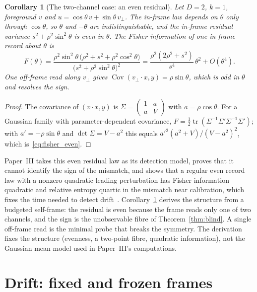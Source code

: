 \documentclass[12pt]{article}
\newtheorem{corollary}[theorem]{Corollary}
\theoremstyle{definition}
\newcommand{\tr}{\operatorname{tr}}
\begin{document}
\begin{corollary}[The two-channel case: an even residual]
\label{cor:even}
Let $D=2$, $k=1$, foreground $v$ and $u=\cos\theta\,v+\sin\theta\,v_\perp$. The in-frame law depends on $\theta$ only through $\cos\theta$, so $\theta$ and $-\theta$ are indistinguishable, and the in-frame residual variance $s^2+\rho^2\sin^2\theta$ is even in $\theta$. The Fisher information of one in-frame record about $\theta$ is
\begin{equation}
\label{eq:fisher_even}
F(\theta)=\frac{\rho^2\sin^2\theta\,\bigl(\rho^2+s^2+\rho^2\cos^2\theta\bigr)}{\bigl(s^2+\rho^2\sin^2\theta\bigr)^2}
=\frac{\rho^2(2\rho^2+s^2)}{s^4}\,\theta^2+O(\theta^4).
\end{equation}
One off-frame read along $v_\perp$ gives $\operatorname{Cov}(v_\perp\cdot x,y)=\rho\sin\theta$, which is odd in $\theta$ and resolves the sign.
\end{corollary}

\begin{proof}
The covariance of $(v\cdot x,y)$ is $\Sigma=\begin{pmatrix}1&a\\a&V\end{pmatrix}$ with $a=\rho\cos\theta$. For a Gaussian family with parameter-dependent covariance, $F=\tfrac12\tr(\Sigma^{-1}\Sigma'\Sigma^{-1}\Sigma')$; with $a'=-\rho\sin\theta$ and $\det\Sigma=V-a^2$ this equals $a'^2(a^2+V)/(V-a^2)^2$, which is~\eqref{eq:fisher_even}.
\end{proof}

Paper~III takes this even residual law as its detection model, proves that it cannot identify the sign of the mismatch, and shows that a regular even record law with a nonzero quadratic leading perturbation has Fisher information quadratic and relative entropy quartic in the mismatch near calibration, which fixes the time needed to detect drift~\cite{Liu2026TDOME_III}. Corollary~\ref{cor:even} derives the structure from a budgeted self-frame: the residual is even because the frame reads only one of two channels, and the sign is the unobservable fibre of Theorem~\ref{thm:blind}. A single off-frame read is the minimal probe that breaks the symmetry. The derivation fixes the structure (evenness, a two-point fibre, quadratic information), not the Gaussian mean model used in Paper~III's computations.

\section{Drift: fixed and frozen frames}
\label{sec:drift}
\end{document}
